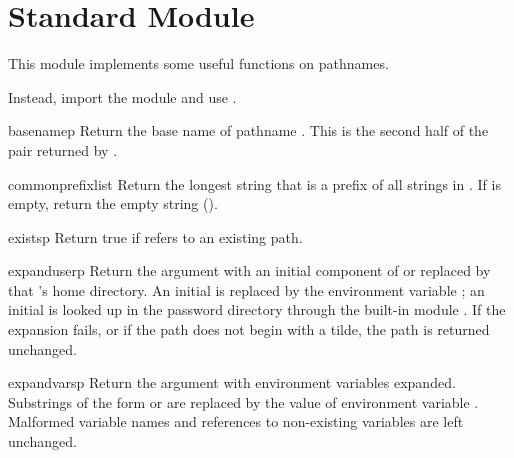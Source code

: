 \section{Standard Module }


This module implements some useful functions on \POSIX{} pathnames.

  Instead, import the
module  and use .


\begin{funcdesc}{basename}{p}
Return the base name of pathname
.
This is the second half of the pair returned by
.
\end{funcdesc}

\begin{funcdesc}{commonprefix}{list}
Return the longest string that is a prefix of all strings in
.
If
is empty, return the empty string ().
\end{funcdesc}

\begin{funcdesc}{exists}{p}
Return true if
refers to an existing path.
\end{funcdesc}

\begin{funcdesc}{expanduser}{p}
Return the argument with an initial component of \samp{\~} or
 replaced by that 's home directory.  An
initial \samp{\~{}} is replaced by the environment variable
; %
an initial  is looked up in the password directory through
the built-in module .  If the expansion
fails, or if the path does not begin with a tilde, the path is
returned unchanged.
\end{funcdesc}

\begin{funcdesc}{expandvars}{p}
Return the argument with environment variables expanded.  Substrings
of the form  or  are
replaced by the value of environment variable .  Malformed
variable names and references to non-existing variables are left
unchanged.
\end{funcdesc}


